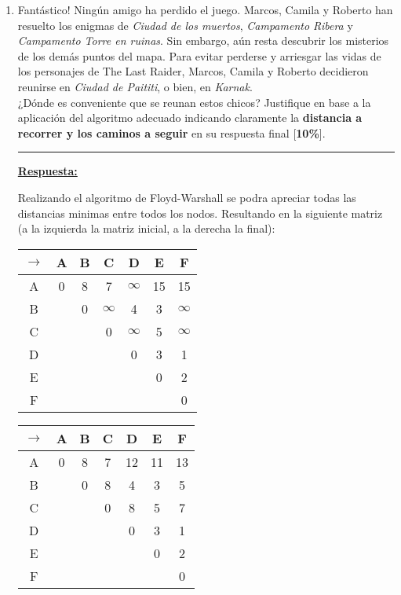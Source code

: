 \documentclass[legalpaper,10pt]{article}
\begin{document}
\begin{enumerate}
\begin{enumerate}
  \newpage






  \item Fantástico! Ningún amigo ha perdido el juego. Marcos, Camila y Roberto han resuelto los enigmas de \textit{Ciudad de los muertos}, \textit{Campamento Ribera} y \textit{Campamento Torre en ruinas}. Sin embargo, aún resta descubrir los misterios de los demás puntos del mapa. Para evitar perderse y arriesgar las vidas de los personajes de The Last Raider, Marcos, Camila y Roberto decidieron reunirse en \textit{Ciudad de Paititi}, o bien, en \textit{Karnak}. \\
  ¿Dónde es conveniente que se reunan estos chicos? Justifique en base a la aplicación del algoritmo adecuado indicando claramente la \textbf{distancia a recorrer y los caminos a seguir} en su respuesta final [\textbf{10\%}].

  \rule{5cm}{0.4pt}

  \underline{\textbf{Respuesta:}}

  Realizando el algoritmo de Floyd-Warshall se podra apreciar todas las distancias minimas entre todos los nodos. Resultando en la siguiente matriz (a la izquierda la matriz inicial, a la derecha la final):

  \begin{center}
    \begin{tabular}{|c|cccccc|}
      \hline
      $\rightarrow$&A&B&C&D&E&F\\
      \hline
      A&0&8&7&$\infty$&15&15 \\
      B&&0&$\infty$&4&3&$\infty$ \\
      C&&&0&$\infty$&5&$\infty$ \\
      D&&&&0&3&1 \\
      E&&&&&0&2 \\
      F&&&&&&0 \\
      \hline
    \end{tabular}
    \qquad
    \begin{tabular}{||c|cccccc||}
      \hline \hline
      $\rightarrow$&A&B&C&D&E&F\\
      \hline
      A&0&8&7&12&11&13 \\
      B&&0&8&4&3&5 \\
      C&&&0&8&5&7 \\
      D&&&&0&3&1 \\
      E&&&&&0&2 \\
      F&&&&&&0 \\
      \hline \hline
    \end{tabular}
  \end{center}


\end{enumerate}
\end{enumerate}
\end{document}
